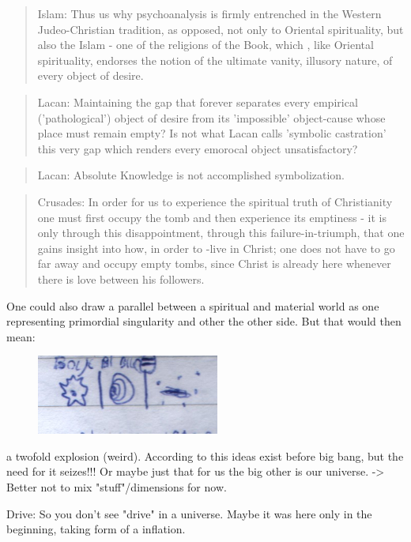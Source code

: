 \documentclass[10pt]{book}
\begin{document}
\begin{quotation}
Islam: Thus us why psychoanalysis is firmly entrenched in the Western Judeo-Christian tradition, as opposed, not only to Oriental spirituality, but also the Islam - one of the religions of the Book, which , like Oriental spirituality, endorses the notion of the ultimate vanity, illusory nature, of every object of desire.
\end{quotation}
\begin{quotation}
Lacan: Maintaining the gap that forever separates every empirical ('pathological') object of desire from its 'impossible' object-cause whose place must remain empty? Is not what Lacan calls 'symbolic castration' this very gap which renders every emorocal object unsatisfactory?
\end{quotation}
\begin{quotation}
Lacan: Absolute Knowledge is not accomplished symbolization.
\end{quotation}
\begin{quotation}
Crusades: In order for us to experience the spiritual truth of Christianity one must first occupy the tomb and then experience its emptiness - it is only through this disappointment, through this failure-in-triumph, that one gains insight into how, in order to -live in Christ; one does not have to go far away and occupy empty tombs, since Christ is already here whenever there is love between his followers.
\end{quotation}


One could also draw a parallel between a spiritual and material world as one representing primordial singularity and other the other side. But that would then mean: 
\begin{figure}[ht!]
\centering
\includegraphics[width=60mm]{scan10.jpg}
\label{overflow}
\end{figure}
a twofold explosion (weird). According to this ideas exist before big bang, but the need for it seizes!!! Or maybe just that for us the big other is our universe. -> Better not to mix "stuff"/dimensions for now.

Drive: So you don't see "drive" in a universe. Maybe it was here only in the beginning, taking form of a inflation.
\end{document}
